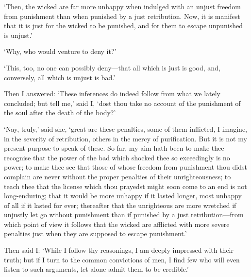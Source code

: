 \documentclass[12pt]{book}
\begin{document}
`Then, the wicked are far more unhappy when indulged with an unjust
freedom from punishment than when punished by a just retribution. Now,
it is manifest that it is just for the wicked to be punished, and for
them to escape unpunished is unjust.'

`Why, who would venture to deny it?'

`This, too, no one can possibly deny---that all which is just is good,
and, conversely, all which is unjust is bad.'

Then I answered: `These inferences do indeed follow from what we lately
concluded; but tell me,' said I, `dost thou take no account of the
punishment of the soul after the death of the body?'

`Nay, truly,' said she, `great are these penalties, some of them
inflicted, I imagine, in the severity of retribution, others in the
mercy of purification. But it is not my present purpose to speak of
these. So far, my aim hath been to make thee recognise that the power of
the bad which shocked thee so exceedingly is no power; to make thee see
that those of whose freedom from punishment thou didst complain are
never without the proper penalties of their unrighteousness; to teach
thee that the license which thou prayedst might soon come to an end is
not long-enduring; that it would be more unhappy if it lasted longer,
most unhappy of all if it lasted for ever; thereafter that the
unrighteous are more wretched if unjustly let go without punishment than
if punished by a just retribution---from which point of view it follows
that the wicked are afflicted with more severe penalties just when they
are supposed to escape punishment.'

Then said I: `While I follow thy reasonings, I am deeply impressed with
their truth; but if I turn to the common convictions of men, I find few
who will even listen to such arguments, let alone admit them to be
credible.'
\end{document}
